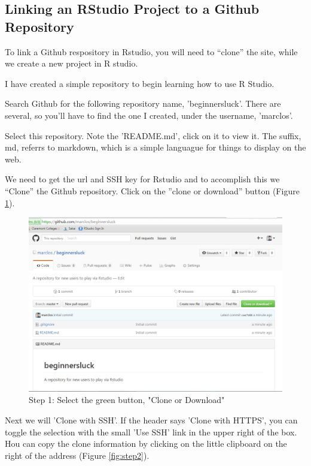 \documentclass[12pt]{../SOP3_beta}
\begin{document}
\subsection{Linking an RStudio Project to a Github Repository}

\NP To link a Github respository in Rstudio, you will need to ``clone'' the site, while we create a new project in R studio.

\NP I have created a simple repository to begin learning how to use R Studio.

\NP Search Github for the following repository name, 'beginnersluck'. There are several, so you'll have to find the one I created, under the username, 'marclos'. 

\NP Select this repository. Note the 'README.md', click on it to view it. The suffix, md, referrs to markdown, which is a simple languague for things to display on the web.

\NP We need to get the url and SSH key for Rstudio and to accomplish this we ``Clone'' the Github repository. Click on the ''clone or download'' button (Figure \ref{fig:step1}).

\begin{figure}
\includegraphics{graphics/CloningGithub.jpg}
\caption{Step 1: Select the green button, "Clone or Download"}
\label{fig:step1}
\end{figure}

\NP Next we will 'Clone with SSH'. If the header says 'Clone with HTTPS', you can toggle the selection with the small 'Use SSH' link in the upper right of the box. Hou can copy the clone information by clicking on the little clipboard on the right of the address (Figure \ref{fig:step2}).
\end{document}
